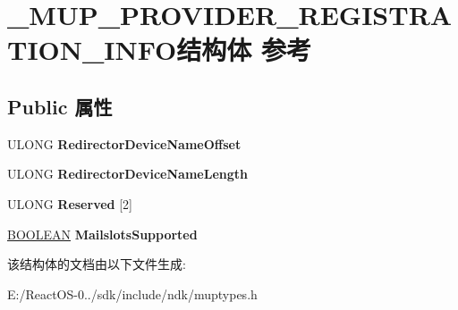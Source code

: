 \hypertarget{struct___m_u_p___p_r_o_v_i_d_e_r___r_e_g_i_s_t_r_a_t_i_o_n___i_n_f_o}{}\section{\+\_\+\+M\+U\+P\+\_\+\+P\+R\+O\+V\+I\+D\+E\+R\+\_\+\+R\+E\+G\+I\+S\+T\+R\+A\+T\+I\+O\+N\+\_\+\+I\+N\+F\+O结构体 参考}
\label{struct___m_u_p___p_r_o_v_i_d_e_r___r_e_g_i_s_t_r_a_t_i_o_n___i_n_f_o}
\subsection*{Public 属性}
\begin{DoxyCompactItemize}
\item 
\mbox{\label{struct___m_u_p___p_r_o_v_i_d_e_r___r_e_g_i_s_t_r_a_t_i_o_n___i_n_f_o_a41b3fd1079bf82f56f918584915f8e52}} 
U\+L\+O\+NG {\bfseries Redirector\+Device\+Name\+Offset}
\item 
\mbox{\label{struct___m_u_p___p_r_o_v_i_d_e_r___r_e_g_i_s_t_r_a_t_i_o_n___i_n_f_o_a84af08ebf41ff1c21a17129cabfcca45}} 
U\+L\+O\+NG {\bfseries Redirector\+Device\+Name\+Length}
\item 
\mbox{\label{struct___m_u_p___p_r_o_v_i_d_e_r___r_e_g_i_s_t_r_a_t_i_o_n___i_n_f_o_add688cce53dbcce269c85b5e4729dd5b}} 
U\+L\+O\+NG {\bfseries Reserved} \mbox{[}2\mbox{]}
\item 
\mbox{\label{struct___m_u_p___p_r_o_v_i_d_e_r___r_e_g_i_s_t_r_a_t_i_o_n___i_n_f_o_ab2dfe76633b040022e62496ce78f239f}} 
\hyperlink{_processor_bind_8h_a112e3146cb38b6ee95e64d85842e380a}{B\+O\+O\+L\+E\+AN} {\bfseries Mailslots\+Supported}
\end{DoxyCompactItemize}


该结构体的文档由以下文件生成\+:\begin{DoxyCompactItemize}
\item 
E\+:/\+React\+O\+S-\/0../sdk/include/ndk/muptypes.\+h\end{DoxyCompactItemize}
